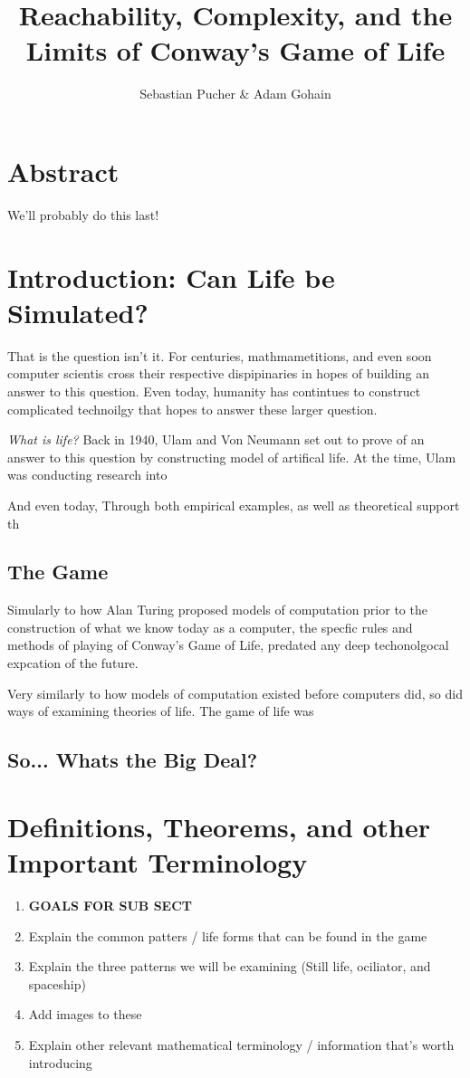 \documentclass{article}
\title{Reachability, Complexity, and the Limits of Conway's Game of Life}
\author{Sebastian Pucher \& Adam Gohain}
\theoremstyle{definition}
\theoremstyle{plain}
\theoremstyle{plain}
\begin{document}
\maketitle

\tableofcontents

\newpage

\section{Abstract}
We'll probably do this last!
\section{Introduction: Can Life be Simulated?}

That is the question isn't it. For centuries, mathmametitions, 
and even soon computer scientis cross their respective dispipinaries in hopes of building an answer to this question. Even today, humanity has contintues to construct complicated technoilgy that hopes to answer these larger question. 

\textit{What is life?} Back in 1940, Ulam and Von Neumann set out to prove of an answer to this question by constructing model of artifical life. At the time, Ulam was conducting research into \cite{Izhikevich_Conway_Seth}

And even today, 
Through both empirical examples, as well as theoretical support th
\subsection{The Game}
Simularly to how Alan Turing proposed models of computation prior to the construction of what we know today as a computer, the specfic rules and methods of playing of Conway's Game of Life, predated any deep techonolgocal expcation of the future. 

Very similarly to how models of computation existed before computers did, so did ways of examining theories of life. The game of life was 

\subsection{So... Whats the Big Deal?}
\section{Definitions, Theorems, and other Important Terminology}
\begin{enumerate}
  \item[] \textbf{GOALS FOR SUB SECT}
  \item Explain the common patters / life forms that can be found in the game
  \item Explain the three patterns we will be examining (Still life, ociliator, and spaceship)
  \item Add images to these 
  \item Explain other relevant mathematical terminology / information that's worth introducing 

\end{enumerate}
\end{document}
